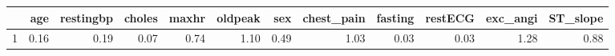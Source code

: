 \begin{table}[ht]
\centering
\begin{tabular}{rrrrrrrrrrrr}
  \hline
 & age & restingbp & choles & maxhr & oldpeak & sex & chest\_pain & fasting & restECG & exc\_angi & ST\_slope \\ 
  \hline
1 & 0.16 & 0.19 & 0.07 & 0.74 & 1.10 & 0.49 & 1.03 & 0.03 & 0.03 & 1.28 & 0.88 \\ 
   \hline
\end{tabular}
\end{table}
